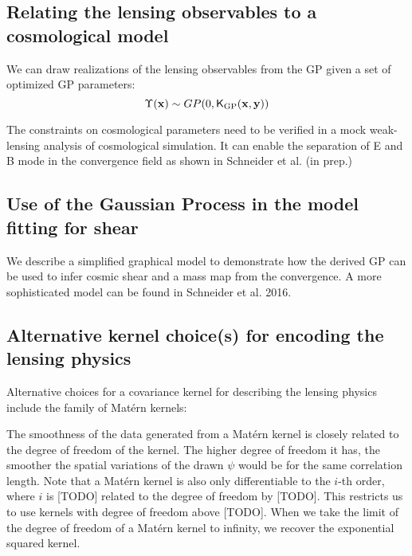 \subsection{Relating the lensing observables to a cosmological model}
We can draw realizations of the lensing observables from the GP given a set of
optimized GP parameters:
\begin{equation}
	\Upsilon(\mathbf{x}) \sim GP(0, \mathsf{K}_{\rm GP}(\mathbf{x}, \mathbf{y})) 
\end{equation}


The constraints on cosmological parameters need to be verified in a mock
weak-lensing analysis of cosmological simulation. 
It can enable the separation of E and B mode in the convergence field as shown
in Schneider et al. (in prep.) 

\subsection{Use of the Gaussian Process in the model fitting for shear}
We describe a simplified graphical model to demonstrate how the derived GP can
be used to infer cosmic shear and a mass map from the convergence.
A more sophisticated model can be found in Schneider et al. 2016.






\subsection{Alternative kernel choice(s) for encoding the lensing physics}
Alternative choices for a covariance kernel for describing the lensing physics 
include the family of Mat\'{e}rn kernels:
% 

The smoothness of the data generated from a Mat\'{e}rn kernel is closely
related to the degree of freedom of the kernel. 
The higher degree of freedom it has, the smoother the spatial variations of the
drawn $\psi$ would be for the same correlation length.
Note that a Mat\'{e}rn kernel is also only differentiable to the $i$-th order,
where $i$ is [TODO] related to the degree of freedom by [TODO].
This restricts us to use kernels with degree of freedom above [TODO]. 
When we take the limit of the degree of freedom of a Mat\'{e}rn kernel to infinity, 
we recover the exponential squared kernel.

